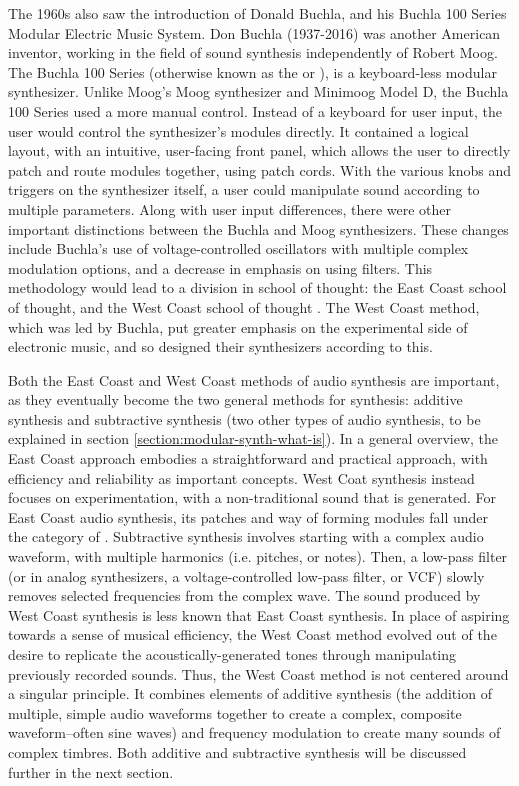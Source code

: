 The 1960s also saw the introduction of Donald  Buchla, and his Buchla 100 Series Modular Electric Music System. Don Buchla (1937-2016) was another American inventor, working in the field of sound synthesis independently of Robert Moog. The Buchla 100 Series (otherwise known as the  or ), is a keyboard-less modular synthesizer. Unlike Moog's Moog synthesizer and Minimoog Model D, the Buchla 100 Series used a more manual control\cite{Pinch_Trocco_1998}. Instead of a keyboard for user input, the user would control the synthesizer's modules directly. It contained a logical layout, with an intuitive, user-facing front panel, which allows the user to directly patch and route modules together, using patch cords. With the various knobs and triggers on the synthesizer itself, a user could manipulate sound according to multiple parameters. Along with user input differences, there were other important distinctions between the Buchla and Moog synthesizers. These changes include Buchla's use of voltage-controlled oscillators with multiple complex modulation options, and a decrease in emphasis on using filters. This methodology would lead to a division in school of thought: the East Coast school of thought, and the West Coast school of thought \cite{Gabrielli_2020}. The West Coast method, which was led by Buchla, put greater emphasis on the experimental side of electronic music, and so designed their synthesizers according to this.

Both the East Coast and West Coast methods of audio synthesis are important, as they eventually become the two general methods for synthesis: additive synthesis and subtractive synthesis (two other types of audio synthesis, to be explained in section \ref{section:modular-synth-what-is}). In a general overview, the East Coast approach embodies a straightforward and practical approach, with efficiency and reliability as important concepts. West Coat synthesis instead focuses on experimentation, with a non-traditional sound that is generated. For East Coast audio synthesis, its patches and way of forming modules fall under the category of . Subtractive synthesis involves starting with a complex audio waveform, with multiple harmonics (i.e. pitches, or notes)\cite{Winer_2018}. Then, a low-pass filter (or in analog synthesizers, a voltage-controlled low-pass filter, or VCF) slowly removes selected frequencies from the complex wave. The sound produced by West Coast synthesis is less known that East Coast synthesis. In place of aspiring towards a sense of musical efficiency, the West Coast method evolved out of the desire to replicate the acoustically-generated tones through manipulating previously recorded sounds\cite{Nielsen}. Thus, the West Coast method is not centered around a singular principle. It combines elements of additive synthesis (the addition of multiple, simple audio waveforms together to create a complex, composite waveform--often sine waves)\cite{Nielsen} and frequency modulation to create many sounds of complex timbres. Both additive and subtractive synthesis will be discussed further in the next section.
